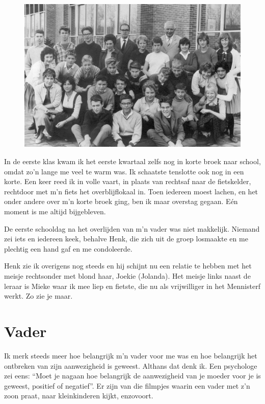 \documentclass[12pt,twoside, openright]{memoir}
\begin{document}
\begin{figure}
\includegraphics[width=\textwidth]{img/ch19/ULOSchool}
\end{figure}

In de eerste klas kwam ik het eerste kwartaal zelfs nog in korte broek naar school, omdat zo’n lange me veel te warm was. Ik schaatste tenslotte ook nog in een korte. Een keer reed ik in volle vaart, in plaats van rechtsaf naar de fietskelder, rechtdoor met m’n fiets het overblijflokaal in. Toen iedereen moest lachen, en het onder andere over m’n korte broek ging, ben ik maar overstag gegaan. Eén moment is me altijd bijgebleven. 

De eerste schooldag na het overlijden van m’n vader was niet makkelijk. Niemand zei iets en iedereen keek, behalve Henk, die zich uit de groep losmaakte en me plechtig een hand gaf en me condoleerde. 

Henk zie ik overigens nog steeds en hij schijnt nu een relatie te hebben met het meisje rechtsonder met blond haar, Joekie (Jolanda). Het meisje links naast de leraar is Mieke waar ik mee liep en fietste, die nu als vrijwilliger in het Mennisterf werkt. Zo zie je maar.

\chapter{Vader} %
\label{cha:vader}

Ik merk steeds meer hoe belangrijk m'n vader voor me was en hoe belangrijk het ontbreken van zijn aanwezigheid is geweest. Althans dat denk ik. Een psychologe zei eens: ``Moet je nagaan hoe belangrijk de aanwezigheid van je moeder voor je is geweest, positief of negatief''. Er zijn van die filmpjes waarin een vader met z'n zoon praat, naar kleinkinderen kijkt, enzovoort.
\end{document}
